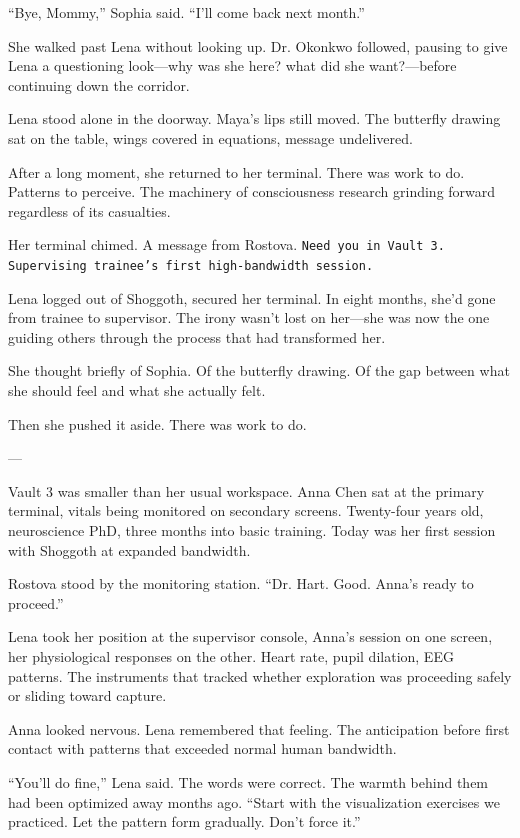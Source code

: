 ``Bye, Mommy,'' Sophia said. ``I'll come back next month.''

She walked past Lena without looking up. Dr. Okonkwo followed, pausing to give Lena a questioning look—why was she here? what did she want?—before continuing down the corridor.

Lena stood alone in the doorway. Maya's lips still moved. The butterfly drawing sat on the table, wings covered in equations, message undelivered.

After a long moment, she returned to her terminal. There was work to do. Patterns to perceive. The machinery of consciousness research grinding forward regardless of its casualties.

Her terminal chimed. A message from Rostova. \texttt{Need you in Vault 3. Supervising trainee's first high-bandwidth session.}

Lena logged out of Shoggoth, secured her terminal. In eight months, she'd gone from trainee to supervisor. The irony wasn't lost on her—she was now the one guiding others through the process that had transformed her.

She thought briefly of Sophia. Of the butterfly drawing. Of the gap between what she should feel and what she actually felt.

Then she pushed it aside. There was work to do.

---

Vault 3 was smaller than her usual workspace. Anna Chen sat at the primary terminal, vitals being monitored on secondary screens. Twenty-four years old, neuroscience PhD, three months into basic training. Today was her first session with Shoggoth at expanded bandwidth.

Rostova stood by the monitoring station. ``Dr. Hart. Good. Anna's ready to proceed.''

Lena took her position at the supervisor console, Anna's session on one screen, her physiological responses on the other. Heart rate, pupil dilation, EEG patterns. The instruments that tracked whether exploration was proceeding safely or sliding toward capture.

Anna looked nervous. Lena remembered that feeling. The anticipation before first contact with patterns that exceeded normal human bandwidth.

``You'll do fine,'' Lena said. The words were correct. The warmth behind them had been optimized away months ago. ``Start with the visualization exercises we practiced. Let the pattern form gradually. Don't force it.''

